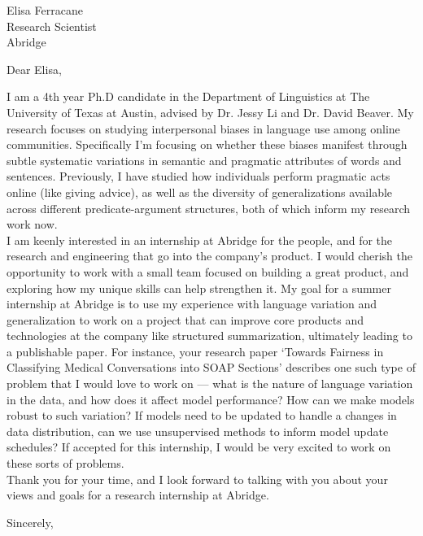 \documentclass[myletter, a4paper, 11pt]{scrlttr2}
\begin{document}
\begin{letter}{
    Elisa Ferracane\\
    Research Scientist\\
    Abridge
}


\opening{Dear Elisa,}

I am a 4th year Ph.D candidate in the Department of Linguistics at The University of Texas at Austin, advised by Dr. Jessy Li and Dr. David Beaver. My research focuses on studying interpersonal biases in language use among online communities. Specifically I'm focusing on whether these biases manifest through subtle systematic variations in semantic and pragmatic attributes of words and sentences. Previously, I have studied how individuals perform pragmatic acts online (like giving advice), as well as the diversity of generalizations available across different predicate-argument structures, both of which inform my research work now.\\

I am keenly interested in an internship at Abridge for the people, and for the research and engineering that go into the company's product. I would cherish the opportunity to work with a small team focused on building a great product, and exploring how my unique skills can help strengthen it. My goal for a summer internship at Abridge is to use my experience with language variation and generalization to work on a project that can improve core products and technologies at the company like structured summarization, ultimately leading to a publishable paper. For instance, your research paper `Towards Fairness in Classifying Medical Conversations into SOAP Sections' describes one such type of problem that I would love to work on --- what is the nature of language variation in the data, and how does it affect model performance? How can we make models robust to such variation? If models need to be updated to handle a changes in data distribution, can we use unsupervised methods to inform model update schedules? If accepted for this internship, I would be very excited to work on these sorts of problems.\\

Thank you for your time, and I look forward to talking with you about your views and goals for a research internship at Abridge.

\closing{Sincerely,}


\end{letter}
\end{document}
